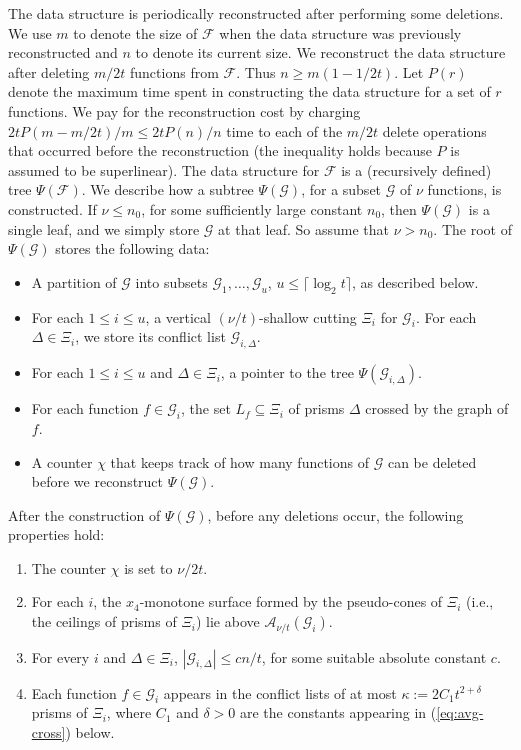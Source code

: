 \documentclass[11pt]{article}
\def\A{\mathcal{A}}
\def\F{\mathcal{F}}
\def\G{\mathcal{G}}
\def\ceil#1{\lceil #1\rceil}
\theoremstyle{definition}
\begin{document}
The data structure is periodically reconstructed after performing some deletions. We use 
$m$ to denote the size of $\F$ when the data structure was previously reconstructed and $n$ 
to denote its current size. We reconstruct the data structure after deleting $m/2t$ functions 
from $\F$. Thus $n \ge m(1-1/2t)$. Let $P(r)$ denote the maximum time spent in constructing the 
data structure for a set of $r$ functions. We pay for the reconstruction cost by charging 
$2tP(m-m/2t)/m \le 2tP(n)/n$ time to each of the $m/2t$ delete operations that occurred 
before the reconstruction (the inequality holds because $P$ is assumed to be superlinear). 
The data structure for $\F$ is a (recursively defined) tree $\Psi(\F)$. We describe how a 
subtree $\Psi(\G)$, for a subset $\G$ of $\nu$ functions, is constructed.
%
If $\nu \le n_0$, for some sufficiently large constant $n_0$, then $\Psi(\G)$ is a single
leaf, and we simply store $\G$ at that leaf. So assume that $\nu > n_0$. The root of $\Psi(\G)$ 
stores the following data:
%
\medskip
\begin{itemize}
	\item A partition of $\G$ into subsets $\G_1, \ldots, \G_u$, $u \le \ceil{\log_2 t}$, 
as described below.
	\item For each $1 \le i \le u$, a vertical $(\nu/t)$-shallow cutting 
$\Xi_i$ for $\G_i$. 
For each $\Delta \in \Xi_i$, we store its conflict list $\G_{i,\Delta}$.
	\item For each $1 \le i \le u$ and $\Delta\in\Xi_i$, a pointer to the tree $\Psi(\G_{i,\Delta})$.
	\item For each function $f\in \G_i$, the set $L_f\subseteq\Xi_i$ of prisms $\Delta$
		crossed by the graph of $f$.
	\item A counter $\chi$ that keeps track of how many functions of $\G$ can be deleted before
		we reconstruct $\Psi(\G)$.
\end{itemize}
%
\medskip
After the construction of $\Psi(\G)$, before any deletions occur, the following properties hold:
%
\medskip
\begin{enumerate}[(P1)]
	\item The counter $\chi$ is set to $\nu/2t$.
	\item For each $i$, the $x_4$-monotone surface formed by the pseudo-cones of $\Xi_i$ 
(i.e., the ceilings of prisms of $\Xi_i$) lie above $\A_{\nu/t} (\G_i)$.
	\item For every $i$ and $\Delta\in \Xi_i$, $|\G_{i,\Delta}| \le cn/t$, 
for some suitable absolute constant $c$.
	\item Each function $f\in \G_i$ appears in the conflict lists of at most
    $\kappa := 2C_1t^{2+\delta}$ 
	prisms of $\Xi_i$, where $C_1$ and $\delta>0$ are the constants appearing in
		(\ref{eq:avg-cross}) below.
\end{enumerate}
\end{document}
